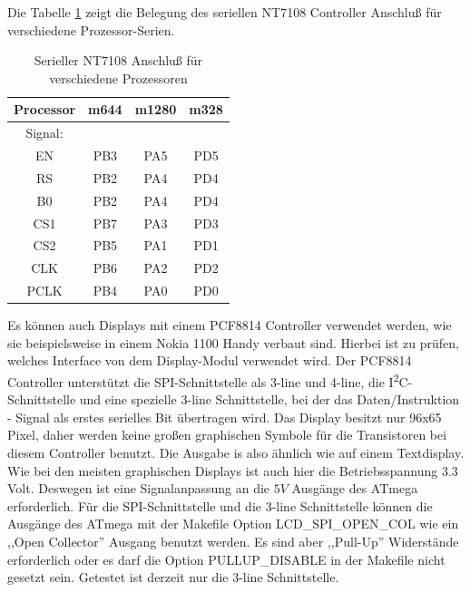 Die Tabelle \ref{tab:7108-processor} zeigt die Belegung des seriellen NT7108 Controller
Anschluß für verschiedene Prozessor-Serien.
\begin{table}[H]
  \begin{center}
    \begin{tabular}{| c || c | c | c |}
    \hline
 Processor  & m644  &  m1280  & m328 \\
    \hline
    \hline
Signal:     &       &        &         \\
  EN        &  PB3  &  PA5   & PD5     \\
    \hline
  RS        &  PB2  &  PA4   & PD4      \\
  B0        &  PB2  &  PA4   & PD4      \\
    \hline
  CS1       &  PB7  &  PA3   & PD3      \\
    \hline
  CS2       &  PB5  &  PA1   & PD1      \\
    \hline
  CLK       &  PB6  &  PA2   & PD2      \\
    \hline
  PCLK      &  PB4  &  PA0   & PD0      \\
    \hline
    \end{tabular}
  \end{center}
  \caption{Serieller NT7108 Anschluß für verschiedene Prozessoren}
  \label{tab:7108-processor}
\end{table}

Es können auch Displays mit einem PCF8814 Controller verwendet werden, wie sie beispielsweise
in einem Nokia 1100 Handy verbaut sind. Hierbei ist zu prüfen, welches Interface von dem Display-Modul
verwendet wird. Der PCF8814 Controller unterstützt die SPI-Schnittstelle als 3-line und 4-line,
die I\textsuperscript{2}C-Schnittstelle und eine spezielle 3-line Schnittstelle, bei der das
Daten/Instruktion - Signal als erstes serielles Bit übertragen wird.
Das Display besitzt nur 96x65 Pixel, daher werden keine großen graphischen Symbole für die
Transistoren bei diesem Controller benutzt. Die Ausgabe is also ähnlich wie auf einem Textdisplay.
Wie bei den meisten graphischen Displays ist auch hier die Betriebsspannung 3.3 Volt.
Deswegen ist eine Signalanpassung an die \(5V\) Ausgänge des ATmega erforderlich.
Für die SPI-Schnittstelle und die 3-line Schnittstelle können die Ausgänge des ATmega
mit der Makefile Option LCD\_SPI\_OPEN\_COL wie ein ,,Open Collector'' Ausgang benutzt werden.
Es sind aber ,,Pull-Up'' Widerstände erforderlich oder es darf die Option PULLUP\_DISABLE
in der Makefile nicht gesetzt sein.
Getestet ist derzeit nur die 3-line Schnittstelle.

